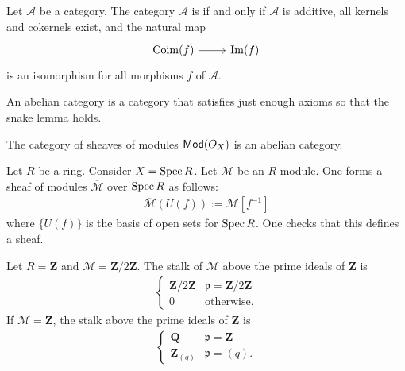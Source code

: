 \documentclass [11 pt, oneside] {article}
\begin{document}
 \begin{definition}\label{}\text{}
Let $\mathscr{A}$ be a category. The category $\mathscr{A}$ is  if and only if $\mathscr{A}$ is additive, all kernels and cokernels exist, and the natural map 
\[
\begin{tikzcd}
\Coim(f)\ar[r]& \Img(f)
\end{tikzcd}
\] 
is an isomorphism for all morphisms $f$ of $\mathscr{A}$.
\end{definition}

\begin{remark}
	An abelian category is a category that satisfies just enough axioms so that the snake lemma holds.
\end{remark}

The category of sheaves of modules $\textsf{Mod}(\relax{O}_X)$ is an abelian category.

\begin{example}[ ]\label{}\text{}
Let $R$ be a ring. Consider $X=\operatorname{Spec} R$. Let $\mathscr{M}$ be an $R$-module. One forms a sheaf of modules $\overline{\mathscr{M}}$ over $\operatorname{Spec} R$ as follows:
\begin{align*}
	\overline{\mathscr{M}}(U(f)) := \mathscr{M}[f^{-1}]
\end{align*}
where $\{U(f)\}$ is the basis of open sets for $\operatorname{Spec} R$. One checks that this defines a sheaf.
\end{example}

\begin{example}[ ]\label{}\text{}
Let $R=\mathbf{Z}$ and $\mathscr{M}=\mathbf{Z}/2\mathbf{Z}$. The stalk of $\mathscr{M}$ above the prime ideals of $\mathbf{Z}$ is
\begin{align*}
	\begin{cases}
		\mathbf{Z}/2\mathbf{Z}& \mathfrak{p}=\mathbf{Z}/2\mathbf{Z}\\
		0&\textrm{otherwise.}
	\end{cases}
\end{align*}
If $\mathscr{M}=\mathbf{Z}$, the stalk above the prime ideals of $\mathbf{Z}$ is 
\begin{align*}
	\begin{cases}
		\mathbf{Q} & \mathfrak{p}=\mathbf{Z}\\
		\mathbf{Z}_{(q)}&  \mathfrak{p}= (q).
	\end{cases}
\end{align*}
\end{example}
\end{document}

